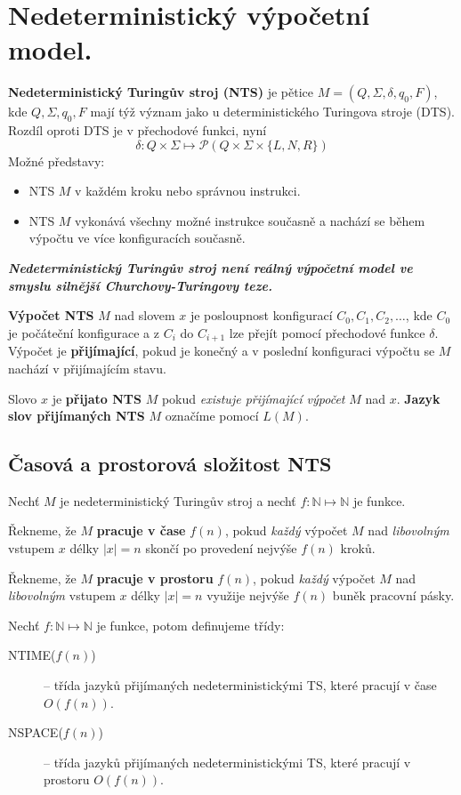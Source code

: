 \documentclass[11pt]{report} %
\newcommand{\N}{\mathbb{N}}
\numberwithin{equation}{section}
\begin{document}
\section{Nedeterministický výpočetní model.}
\textbf{Nedeterministický Turingův stroj (NTS)} je pětice $M = (Q, \Sigma, \delta, q_0, F)$, kde $Q, \Sigma, q_0, F$ mají týž význam jako u  deterministického Turingova stroje (DTS). Rozdíl oproti DTS je v přechodové funkci, nyní
$$\delta : Q \times \Sigma \mapsto \mathcal{P}(Q \times \Sigma \times \{L, N, R\})$$
Možné představy:
\begin{itemize}
	
	
	\item NTS $M$ v každém kroku  nebo  správnou instrukci.
	\item NTS $M$ vykonává všechny možné instrukce současně a nachází se během výpočtu ve více konfiguracích současně.
\end{itemize}

\textbf{\textit{Nedeterministický Turingův stroj není reálný výpočetní model ve smyslu silnější Churchovy-Turingovy teze.}}
\medskip

\textbf{Výpočet NTS} $M$ nad slovem $x$ je posloupnost konfigurací $C_0, C_1, C_2, \dots$, kde $C_0$ je počáteční konfigurace a z $C_i$ do $C_{i+1}$ lze přejít pomocí přechodové funkce $\delta$. Výpočet je \textbf{přijímající}, pokud je konečný a v poslední konfiguraci výpočtu se $M$ nachází v přijímajícím stavu.

Slovo $x$ je \textbf{přijato NTS} $M$ pokud \textit{existuje přijímající výpočet} $M$ nad $x$. \textbf{Jazyk slov přijímaných NTS} $M$ označíme pomocí $L(M)$.

\subsection{Časová a prostorová složitost NTS}
Nechť $M$ je nedeterministický Turingův stroj a nechť $f : \N \mapsto \N$ je funkce.

Řekneme, že $M$ \textbf{pracuje v čase} $f(n)$, pokud \textit{každý} výpočet $M$ nad \textit{libovolným} vstupem $x$ délky $|x| = n$ skončí po provedení nejvýše $f(n)$ kroků.

Řekneme, že $M$ \textbf{pracuje v prostoru} $f(n)$, pokud \textit{každý} výpočet $M$ nad \textit{libovolným} vstupem $x$ délky $|x| = n$ využije nejvýše $f(n)$ buněk pracovní pásky.

Nechť $f : \N \mapsto \N$ je funkce, potom definujeme třídy:
\begin{description}
	\item[NTIME($f(n)$)] – třída jazyků přijímaných nedeterministickými TS, které pracují v čase $O(f(n))$.
	\item[NSPACE($f(n)$)] – třída jazyků přijímaných nedeterministickými TS, které pracují v prostoru $O(f(n))$.
\end{description}
\end{document}
